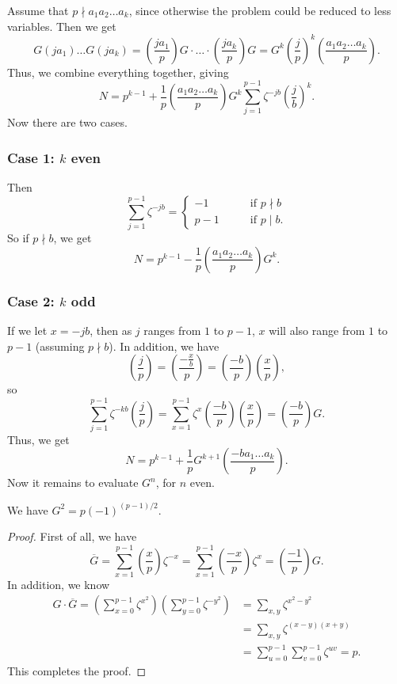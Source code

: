 \documentclass{scrartcl}
\begin{document}
Assume that $p\nmid a_1a_2\dots a_k$, since otherwise the problem could be reduced to less variables. 
Then we get 
$$G(ja_1)\dots G(ja_k)=\left(\frac{ja_1}p\right)G\cdot \ldots \cdot \left(\frac{ja_k}p\right)G=G^k\left(\frac jp\right)^k \left(\frac{a_1a_2\dots a_k}p\right).$$
Thus, we combine everything together, giving
$$N = p^{k-1}+\frac{1}{p}\left(\frac{a_1a_2\dots a_k}p\right) G^k \sum_{j=1}^{p-1}\zeta^{-jb}\left(\frac jb\right)^k.$$
Now there are two cases.

\subsubsection{Case 1: $k$ even}
Then $$\sum_{j=1}^{p-1} \zeta^{-jb} = \begin{cases} -1 \qquad &\text{if } p\nmid b \\
p-1 \qquad &\text{if } p\mid b.
\end{cases}$$
So if $p\nmid b$, we get $$N=p^{k-1}-\frac{1}{p}\left(\frac{a_1a_2\dots a_k}p\right)G^k.$$

\subsubsection{Case 2: $k$ odd} 
If we let $x=-jb$, then as $j$ ranges from $1$ to $p-1$, 
$x$ will also range from $1$ to $p-1$ (assuming $p\nmid b$). 
In addition, we have 
$$\left(\frac jp\right)=\left(\frac{-\frac xb}p\right)=\left(\frac{-b}p\right)\left(\frac xp\right),$$
so $$\sum_{j=1}^{p-1} \zeta^{-kb}\left(\frac jp\right) = \sum_{x=1}^{p-1}\zeta^{x}\left(\frac{-b}p\right)\left(\frac xp \right) = \left(\frac{-b}p\right)G.$$
Thus, we get
$$N = p^{k-1}+\frac{1}{p} G^{k+1} \left(\frac{-ba_1\dots a_k}{p}\right).$$
Now it remains to evaluate $G^n$, for $n$ even.

\begin{theorem}[Gauss]
	We have $G^2 = p(-1)^{(p-1)/2}$.
\end{theorem}

\begin{proof}
	First of all, we have 
	$$\overline{G} = \sum_{x=1}^{p-1}\left(\frac xp\right) \zeta^{-x} = 
	\sum_{x=1}^{p-1} \left(\frac{-x}p\right)\zeta^{x} = \left(\frac{-1}p\right) G.$$
	In addition, we know
	\begin{align*}
		G\cdot \overline{G} = \left(\sum_{x=0}^{p-1}\zeta^{x^2}\right) \left(\sum_{y=0}^{p-1}\zeta^{-y^2}\right) 
		&= \sum_{x, y} \zeta^{x^2-y^2} \\
		&= \sum_{x, y} \zeta^{(x-y)(x+y)} \\
		&= \sum_{u=0}^{p-1}\sum_{v=0}^{p-1} \zeta^{uv} = p.
	\end{align*}
	This completes the proof.
\end{proof}
\end{document}
